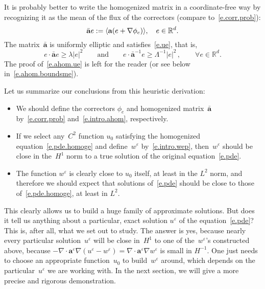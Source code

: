 \documentclass[11pt]{article} %
\numberwithin{equation}{section}
\theoremstyle{definition}
\let\originalleft\left
\let\originalright\right
\renewcommand{\left}{\mathopen{}\mathclose\bgroup\originalleft}
\renewcommand{\right}{\aftergroup\egroup\originalright}
\newcommand*{\R}{\ensuremath{\mathbb{R}}}
\newcommand{\eps}{\varepsilon}
\newcommand{\ep}{\eps}
\renewcommand{\a}{\mathbf{a}}
\newcommand{\ahom}{\bar{\a}}
\begin{document}
\smallskip

It is probably better to write the homogenized matrix in a coordinate-free way by recognizing it as the mean of the flux of the correctors (compare to~\eqref{e.corr.prob}): 
\begin{equation}
\label{e.intro.ahom}
\ahom e
:=
\left\langle \a \left( e+ \nabla \phi_e    \right) \right\rangle, \quad e\in\R^d. 
\end{equation}
The matrix~$\ahom$ is uniformly elliptic and satisfies~\eqref{e.ue}, that is, 
\begin{equation}
\label{e.ahom.ue}
e\cdot \ahom e\geq \lambda |e|^2 
\qquad \mbox{and} \qquad 
e\cdot \ahom^{-1} e\geq \Lambda^{-1} |e|^2 \,,
\qquad 
\forall e\in\R^d. 
\end{equation}
The proof of~\eqref{e.ahom.ue} is left for the reader (or see below in~\eqref{e.ahom.boundsme}).

\smallskip

Let us summarize our conclusions from this heuristic derivation:
\begin{itemize}
\item We should  define the correctors $\phi_e$ and homogenized matrix~$\ahom$ by~\eqref{e.corr.prob} and~\eqref{e.intro.ahom}, respectively.

\item If we select any~$C^2$ function $u_0$ satisfying the homogenized equation~\eqref{e.pde.homoge} and define~$w^\ep$ by~\eqref{e.intro.wep}, then~$w^\ep$ should be close in the~$H^1$ norm to a true solution of the original equation~\eqref{e.pde}.

\item The function $w^\ep$ is clearly close to $u_0$ itself, at least in the $L^2$ norm, and therefore we should expect that solutions of~\eqref{e.pde} should be close to those of~\eqref{e.pde.homoge}, at least in $L^2$. 

\end{itemize}

This clearly allows us to build a huge family of approximate solutions. But does it tell us anything about a particular, exact solution $u^\ep$ of the equation~\eqref{e.pde}? This is, after all, what we set out to study. 
The answer is yes, because nearly every particular solution~$u^\ep$ will be close in~$H^1$ to one of the~$w^\ep$'s constructed above, because $-\nabla\cdot \a^\ep\nabla (u^\ep - w^\ep) = \nabla\cdot \a^\ep\nabla w^\ep$ is small in $H^{-1}$. One just needs to choose an appropriate function~$u_0$ to build~$w^\ep$ around, which depends on the particular~$u^\ep$ we are working with. In the next section, we will give a more precise and rigorous demonstration. 
\end{document}
